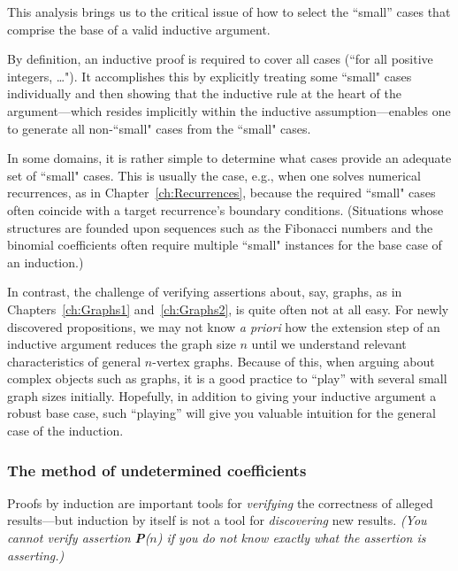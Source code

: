 \smallskip

This analysis brings us to the critical issue of how to select the ``small'' cases that comprise the base of a valid inductive argument.

\medskip

By definition, an inductive proof is required to cover all cases (``for all positive integers, \ldots").  It accomplishes this by explicitly treating some ``small" cases individually and then showing that the inductive rule at the heart of the argument---which resides implicitly within the inductive assumption---enables one to generate all non-``small" cases from the ``small" cases.

In some domains, it is rather simple to determine what cases provide an adequate set of ``small" cases.  This is usually the case, e.g., when one solves numerical recurrences, as in Chapter~\ref{ch:Recurrences}, because the required ``small" cases often coincide with a target recurrence's boundary conditions.  (Situations whose structures are founded upon sequences such as the Fibonacci numbers and the binomial coefficients often require multiple ``small" instances for the base case of an induction.)

 

In contrast, the challenge of verifying assertions about, say, graphs, as in Chapters~\ref{ch:Graphs1} and~\ref{ch:Graphs2}, is quite often not at all easy.  For newly discovered propositions, we may not know {\em a priori} how the extension step of an inductive argument reduces the graph size $n$ until we understand relevant characteristics of general $n$-vertex graphs.  Because of this, when arguing about complex objects such as graphs, it is a good practice to ``play'' with several small graph sizes initially.  Hopefully, in addition to giving your inductive argument a robust base case, such ``playing'' will give you valuable intuition for the general case of the induction.


\subsubsection{The method of undetermined coefficients}
\label{sec:undetermined-coefficients1}


Proofs by induction are important tools for {\em verifying} the correctness of alleged results---but induction by itself is not a tool for {\em discovering} new results.  {\em (You cannot {\em verify} assertion {\bf P}($n$) if you do not know {\em exactly} what the assertion is asserting.)}

